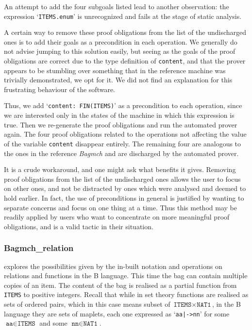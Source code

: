 \documentclass[12pt,journal,duplex]{IEEEtran}
\begin{document}
	An attempt to add the four subgoals listed lead to another observation: the expression `\texttt{ITEMS.enum}' is unrecognized and fails at the stage of static analysis.

	A certain way to remove these proof obligations from the list of the undischarged ones is to add their goals as a precondition in each operation. We generally do not advise jumping to this solution easily, but seeing as the goals of the proof obligations are correct due to the type definition of \texttt{content}, and that the prover appears to be stumbling over something that in the reference machine was trivially demonstrated, we opt for it. We did not find an explanation for this frustrating behaviour of the software.

	Thus, we add `\texttt{content: FIN(ITEMS)}' as a precondition to each operation, since we are interested only in the states of the machine in which this expression is true. Then we re-generate the proof obligations and run the automated prover again. The four proof obligations related to the operations not affecting the value of the variable \texttt{content} disappear entirely. The remaining four are analogous to the ones in the reference \emph{Bagmch} and are discharged by the automated prover.

	It is a crude workaround, and one might ask what benefits it gives. Removing proof obligations from the list of the undischarged ones allows the user to focus on other ones, and not be distracted by ones which were analysed and deemed to hold earlier. In fact, the use of preconditions in general is justified by wanting to separate concerns and focus on one thing at a time. Thus this method may be readily applied by users who want to concentrate on more meaningful proof obligations, and is a valid tactic in their situation.

	\subsubsection{Bagmch\_relation} explores the possibilities given by the in-built notation and operations on relations and functions in the B language. This time the bag can contain multiple copies of an item. The content of the bag is realised as a partial function from \texttt{ITEMS} to positive integers. Recall that while in set theory functions are realised as sets of ordered pairs, which in this case means subset of $\texttt{ITEMS} \times \texttt{NAT1}$, in the B language they are sets of maplets, each one expressed as `\texttt{aa|->nn}' for some $\texttt{aa} \in \texttt{ITEMS}$ and some $\texttt{nn} \in \texttt{NAT1}$.
\end{document}
